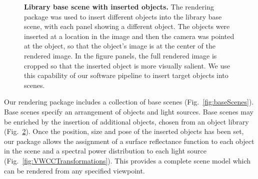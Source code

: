 \documentclass{jov}
\begin{document}
\begin{figure}
\begin{subfigure}[b]{0.14 \textwidth}
        \label{fig:libraryWithChampagneBottle}
    \end{subfigure}
\caption{{\bf Library base scene with inserted objects.} The rendering package was used to insert different objects into the library base scene, with each panel showing a different object. The objects were inserted at a location in the image and then the camera was pointed at the object, so that the object's image is at the center of the rendered image.  In the figure panels, the full rendered image is cropped so that the inserted object is more visually salient. We use this capability of our software pipeline to insert target objects into scenes.}\label{fig:libraryWithTarget}
\end{figure}

Our rendering package includes a collection of base scenes (Fig.~\ref{fig:baseScenes}).
Base scenes specify an arrangement of objects and light sources.
Base scenes may be enriched by the insertion of additional objects, chosen from an object library (Fig.~\ref{fig:libraryWithTarget}).
Once the position, size and pose of the inserted objects has been set, our package allows the assignment of a surface reflectance function to each object in the scene and a spectral power distribution to each light source (Fig.~\ref{fig:VWCCTransformations}).
This provides a complete scene model which can be rendered from any specified viewpoint.
\end{document}
